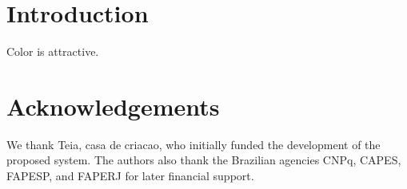 \documentclass[a4paper,12pt]{elsarticle_rfabbri}
\begin{document}


\section{Introduction}

Color is attractive.

\section*{Acknowledgements}
We thank Teia, casa de criacao, who initially funded the development of the proposed
system.  The authors also thank the Brazilian agencies CNPq, CAPES, FAPESP, and
FAPERJ for later financial support.




\end{document}
